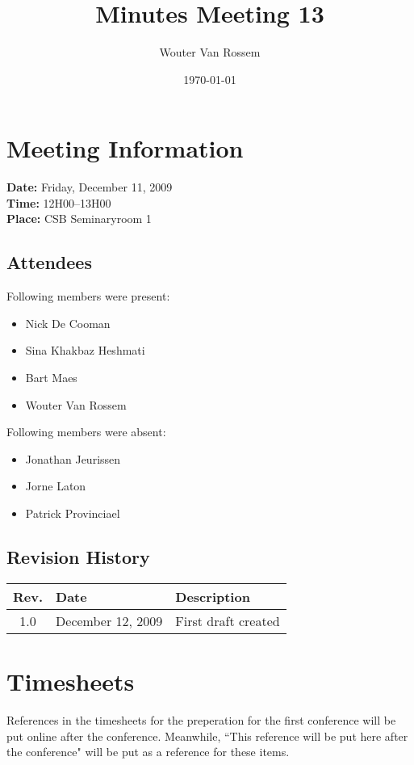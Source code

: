 \documentclass[a4paper, 12pt]{article}
\begin{document}
\title{Minutes Meeting 13}
\author{Wouter Van Rossem}
\date{\today}

\maketitle	
	\section{Meeting Information}
		\textbf{Date:} Friday, December 11, 2009\\
		\textbf{Time:} 12H00--13H00\\
		\textbf{Place:} CSB Seminaryroom 1\\
		\subsection{Attendees}
Following members were present:
			\begin{itemize}
				\item Nick De Cooman
				\item Sina Khakbaz Heshmati
				\item Bart Maes
				\item Wouter Van Rossem
			\end{itemize}
Following members were absent:
			\begin{itemize}
				\item Jonathan Jeurissen
				\item Jorne Laton
				\item Patrick Provinciael
			\end{itemize}
			
		\subsection{Revision History}
			\begin{tabular}{c | l | l }
				\textbf{Rev.} & \textbf{Date} & \textbf{Description} \\
				\hline
				1.0 & December 12, 2009 & First draft created \\

			\end{tabular}		

	\section{Timesheets}
References in the timesheets for the preperation for the first conference will be put online after the conference. Meanwhile, ``This reference will be put here after the conference" will be put as a reference for these items.
\end{document}
